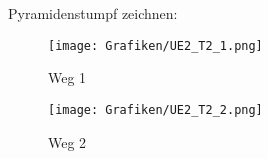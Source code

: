 \begin{Loesung}
\usetikzlibrary{calc}
	Pyramidenstumpf zeichnen:
	\begin{figure}[H]
		\centering
		\texttt{[image: Grafiken/UE2\_T2\_1.png]}
		\caption{Weg 1}
	\label{fig:T2_1}
	\end{figure}
	\begin{figure}[H]
		\centering
		\texttt{[image: Grafiken/UE2\_T2\_2.png]}
		\caption{Weg 2}
	\label{fig:T2_2}
	\end{figure}
\end{Loesung}
%
